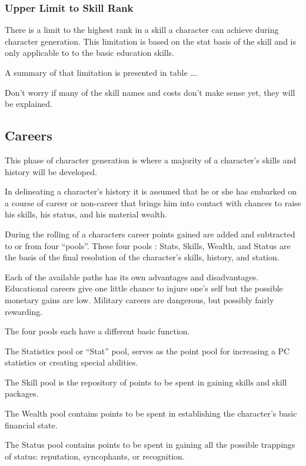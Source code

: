 \subsubsection{Upper Limit to Skill Rank}

There is a limit to the highest rank in a skill a character can 
achieve during character generation. This limitation 
is based on the stat basis of the skill and is only applicable to to 
the basic education skills. 

A summary of that limitation is presented in table \dots.



Don't worry if many of the skill names and costs don't make sense 
yet, they will be explained.

\subsection{Careers}

This phase of character generation is where a majority of a character's
skills and history will be developed. 

In delineating a character's history it is assumed that he or she has
embarked on a course of career or non-career that brings him into
contact with chances to raise his skills, his status, and his material
wealth.

During the rolling of a characters career points gained are added 
and subtracted to or from four ``pools''. These four pools : Stats, 
Skills, Wealth, and Status are the basis of the final resolution of 
the character's skills, history, and station.

Each of the available paths has its own advantages and disadvantages.
Educational careers give one little chance to injure one's self but the
possible monetary gains are low.  Military careers are dangerous, but
possibly fairly rewarding.

The four pools each have a different basic function.

The Statistics pool or ``Stat'' pool, serves as the point pool for 
increasing a PC statistics or creating special abilities.

The Skill pool is the repository of points to be spent in gaining 
skills and skill packages.

The Wealth pool contains points to be spent in establishing the
character's basic financial state.

The Status pool contains points to be spent in gaining all the 
possible trappings of status: reputation, syncophants, or recognition.

